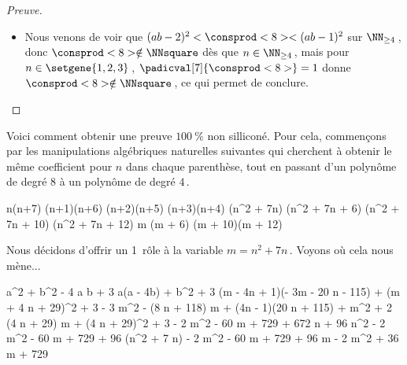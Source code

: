 \begin{proof}[Preuve]
	\begin{itemize}
		\item Nous venons de voir que $( a b - 2)^2 < \consprod<8> < ( a b - 1)^2$ sur $\NN_{\geq 4}$\,, donc $\consprod<8> \notin \NNsquare$ dès que $n \in \NN_{\geq 4}$\,, mais pour $n \in \setgene{1, 2, 3}$\,, $\padicval[7]{\consprod<8>} =1$ donne $\consprod<8> \notin \NNsquare$\,, ce qui permet de conclure.\qedhere
	\end{itemize}
\end{proof}




\begin{remark} \label{no-silicon}
	Voici comment obtenir une preuve $\qty{100}{\percent}$ non silliconé.
	Pour cela, commençons par les manipulations algébriques naturelles suivantes qui cherchent à obtenir le même coefficient pour $n$ dans chaque parenthèse, tout en passant d'un polynôme de degré $8$ à un polynôme de degré $4$\,.
    
    \medskip
    
    \begin{stepcalc}[style = sar]
    \explnext{}
    	n(n+7) \cdot (n+1)(n+6) \cdot (n+2)(n+5) \cdot (n+3)(n+4)
    \explnext{}
    	(n^2 + 7n) \cdot (n^2 + 7n + 6) \cdot (n^2 + 7n + 10) \cdot (n^2 + 7n + 12)
    	m (m + 6) (m + 10)(m + 12)
    \end{stepcalc}
    
    \medskip
    Nous décidons d'offrir un 1\ier\ rôle à la variable $m = n^2 + 7n$\,. Voyons où cela nous mène...
    
	\medskip
	\begin{stepcalc}[style = ar*, ope={=}]
    	a^2 + b^2 - 4 a b + 3
    \explnext{}
    	a(a - 4b) + b^2 + 3
    	(m - 4n + 1)(- 3m - 20 n - 115) 
		+
		(m + 4 n + 29)^2
		+
		3
    \explnext{}
    	- 3 m^2 - (8 n + 118) m + (4n - 1)(20 n + 115)
		+
		m^2 + 2 (4 n + 29) m
		+
		(4 n + 29)^2
		+
		3
    \explnext{}
    	- 2 m^2
		- 60 m 
		+
		729 + 672 n + 96 n^2
    	- 2 m^2
		- 60 m 
		+ 729 + 96 (n^2 + 7 n)
    \explnext{}
    	- 2 m^2
		- 60 m 
		+ 729 + 96 m
    \explnext{}
    	- 2 m^2 + 36 m + 729
    \end{stepcalc}
\end{remark}

